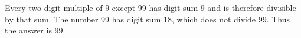 Every two-digit multiple of 9 except 99 has digit sum 9 and is therefore divisible by that sum. The number 99 has digit sum 18, which does not divide 99. Thus the answer is $\boxed{99}$.
